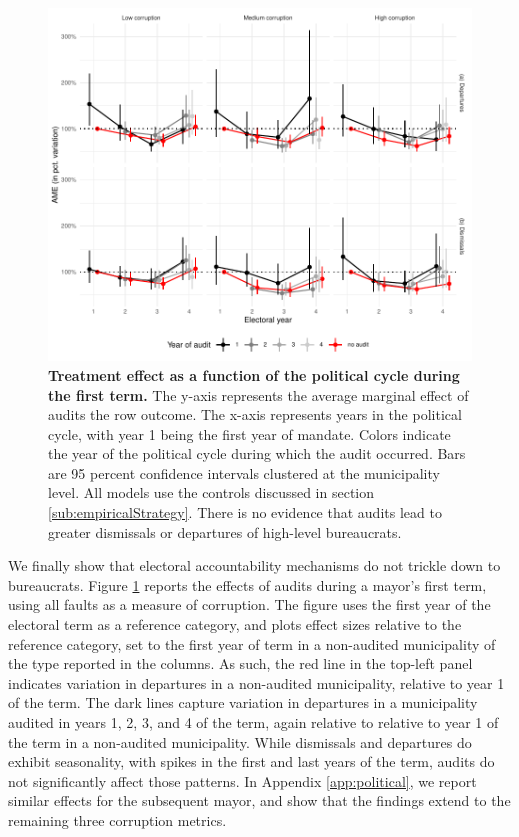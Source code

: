 \documentclass[12pt,a4paper]{article}
\theoremstyle{definition}
\begin{document}
\begin{figure}[h]
    \centering
    \includegraphics{figures/AMEpolitical_term1Client.pdf}
    \caption{{\bf Treatment effect as a function of the political cycle during the first term.} The y-axis represents the average marginal effect of audits the row outcome. The x-axis represents years in the political cycle, with year 1 being the first year of mandate. Colors indicate the year of the political cycle during which the audit occurred. Bars are 95 percent confidence intervals clustered at the municipality level. All models use the controls discussed in section \ref{sub:empiricalStrategy}. There is no evidence that audits lead to greater dismissals or departures of high-level bureaucrats.}
    \label{fig:AMEpolitical1}
\end{figure}

We finally show that electoral accountability mechanisms do not trickle down to bureaucrats. Figure \ref{fig:AMEpolitical1} reports the effects of audits during a mayor's first term, using all faults as a measure of corruption. The figure uses the first year of the electoral term as a reference category, and plots effect sizes relative to the reference category, set to the first year of term in a non-audited municipality of the type reported in the columns. As such, the red line in the top-left panel indicates variation in departures in a non-audited municipality, relative to year 1 of the term. The dark lines capture variation in departures in a municipality audited in years 1, 2, 3, and 4 of the term, again relative to relative to year 1 of the term in a non-audited municipality. While dismissals and departures do exhibit seasonality, with spikes in the first and last years of the term, audits do not significantly affect those patterns. In Appendix \ref{app:political}, we report similar effects for the subsequent mayor, and show that the findings extend to the remaining three corruption metrics. 
\end{document}
